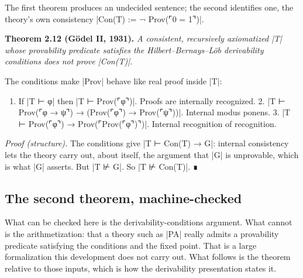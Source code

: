 \documentclass{memoir}
\begin{document}
The first theorem produces an undecided sentence; the second identifies one, the
theory's own consistency \LeanVerb|Con(T) := ¬ Prov(⌜0 = 1⌝)|.

\textbf{Theorem 2.12 (Gödel II, 1931).} \emph{A consistent, recursively axiomatized \LeanVerb|T| whose
provability predicate satisfies the Hilbert–Bernays–Löb derivability conditions
does not prove \LeanVerb|Con(T)|.}

The conditions make \LeanVerb|Prov| behave like real proof inside \LeanVerb|T|:

\begin{enumerate}
\item If \LeanVerb|T ⊢ φ| then \LeanVerb|T ⊢ Prov(⌜φ⌝)|. Proofs are internally recognized. 2. \LeanVerb|T ⊢ Prov(⌜φ → ψ⌝) → (Prov(⌜φ⌝) → Prov(⌜ψ⌝))|.
Internal modus ponens. 3. \LeanVerb|T ⊢ Prov(⌜φ⌝) → Prov(⌜Prov(⌜φ⌝)⌝)|. Internal
recognition of recognition.

\end{enumerate}


\emph{Proof (structure).} The conditions give \LeanVerb|T ⊢ Con(T) → G|: internal consistency
lets the theory carry out, about itself, the argument that \LeanVerb|G| is unprovable,
which is what \LeanVerb|G| asserts. But \LeanVerb|T ⊬ G|. So \LeanVerb|T ⊬ Con(T)|. ∎



\subsection{The second theorem, machine-checked}\label{Two--Schemas--of--Impossibility-005F-005F-005F--Machine--Checked--Limits--of--Trustworthy--Machine--Learning-005F-005F-005F--and--Why--They--Tighten--with--Capability----The--Classical--Limits----G-005F-005F-005Fdel-005F-005F-005Fs--second--incompleteness--theorem----The--second--theorem-005F-005F-005F--machine--checked}

What can be checked here is the derivability-conditions argument. What cannot is
the arithmetization: that a theory such as \LeanVerb|PA| really admits a provability
predicate satisfying the conditions and the fixed point. That is a large
formalization this development does not carry out. What follows is the theorem
relative to those inputs, which is how the derivability presentation states it.
\end{document}
